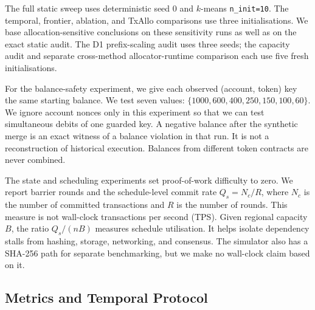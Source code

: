 \documentclass[conference,letterpaper]{IEEEtran}
\begin{document}
The full static sweep uses deterministic seed 0 and $k$-means
\texttt{n\_init=10}. The temporal, frontier, ablation, and TxAllo comparisons
use three initialisations. We base allocation-sensitive conclusions on these
sensitivity runs as well as on the exact static audit. The D1 prefix-scaling
audit uses three seeds; the capacity audit and separate cross-method
allocator-runtime comparison each use five fresh initialisations.

For the balance-safety experiment, we give each observed (account, token)
key the same starting balance. We test seven values:
$\{1000,600,400,250,150,100,60\}$. We ignore account nonces only in this
experiment so that we can test simultaneous debits of one guarded key. A
negative balance after the synthetic merge is an exact witness of a balance
violation in that run. It is not a reconstruction of historical execution.
Balances from different token contracts are never combined.

The state and scheduling experiments set proof-of-work difficulty to zero.
We report barrier rounds and the schedule-level commit rate
$Q_s=N_c/R$, where $N_c$ is the number of committed transactions and $R$ is
the number of rounds. This measure is not wall-clock transactions per second
(TPS). Given regional capacity $B$, the ratio $Q_s/(nB)$ measures schedule
utilisation. It helps isolate dependency stalls from hashing, storage,
networking, and consensus. The simulator also has a SHA-256 path for separate
benchmarking, but we make no wall-clock claim based on it.

\subsection{Metrics and Temporal Protocol}
\end{document}
